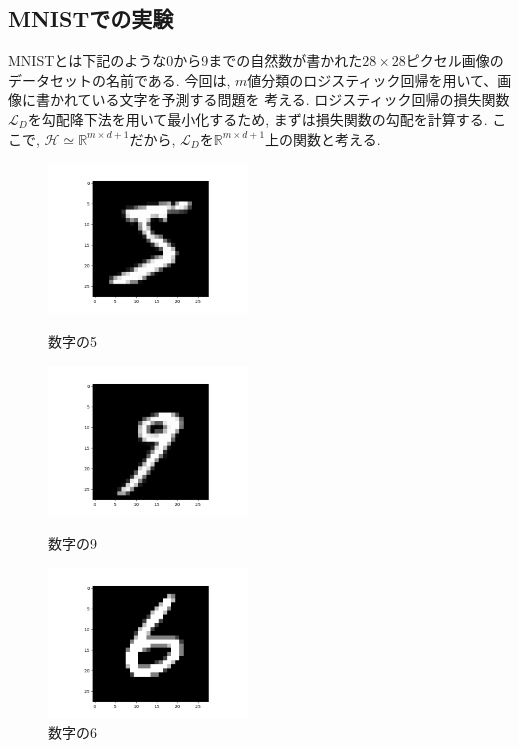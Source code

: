 \documentclass[11pt, a4paper, dvipdfmx]{jsarticle}
\theoremstyle{definition}
\newcommand{\R}{\mathbb{R}}
\newcommand{\Hil}{\mathcal{H}}
\newcommand{\Loss}{\mathcal{L}_{D}}
\begin{document}
\subsection{MNISTでの実験}
MNISTとは下記のような0から9までの自然数が書かれた$28\times28$ピクセル画像のデータセットの名前である. 
今回は, $m$値分類のロジスティック回帰を用いて、画像に書かれている文字を予測する問題を
考える. ロジスティック回帰の損失関数$\Loss$を勾配降下法を用いて最小化するため, まずは損失関数の勾配を計算する.
ここで, $\Hil\simeq\R^{m\times d + 1}$だから, $\Loss$を$\R^{m\times d + 1}$上の関数と考える.\
\begin{figure}[htbp]
    \begin{minipage}{0.32\hsize}
        \centering
        \includegraphics[width = 5.3cm]{Images/MNIST_sample1.png}
        \caption{数字の5}
    \end{minipage}
    \begin{minipage}{0.32\hsize}
        \centering
        \includegraphics[width = 5.3cm]{Images/MNIST_sample2.png}
        \caption{数字の9}
    \end{minipage}
    \begin{minipage}{0.32\hsize}
        \centering
        \includegraphics[width = 5.3cm]{Images/MNIST_sample3.png}
        \caption{数字の6}
    \end{minipage}
\end{figure}
\end{document}
